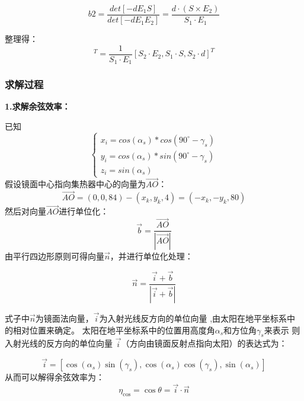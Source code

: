 \documentclass{数学建模}
\begin{document}
\begin{equation}
    b2 = \frac{det[-d E_1 S ]}{det[-d E_1 E_2]} = \frac{d \cdot (S\times E_2)}{S_1\cdot E_1}
\end{equation}

整理得：
\begin{equation}
    [t,b1,b2 ]^T = \frac{1}{S_1\cdot E_1}  [S_2 \cdot E_2,S_1 \cdot S,S_2 \cdot d ]^T
\end{equation}

\subsubsection{求解过程}

\textbf{1.求解余弦效率：}


已知
\begin{equation}
    \begin{cases}
        x_{i} = cos(\alpha_s)*cos(90^\circ - \gamma_s)  \\
        y_{i} = cos(\alpha_s)*sin(90^\circ - \gamma_s)  \\
        z_{i} = sin(\alpha_s)
    \end{cases}
\end{equation}
假设镜面中心指向集热器中心的向量为$\overrightarrow{AO} $：
\begin{equation}
    \vec{AO} =(0,0,84) -(x_k,y_k,4) = (-x_k,-y_k,80)
\end{equation}
然后对向量$\overrightarrow{AO} $进行单位化：
\begin{equation}
    \vec{b} = \frac{\vec{AO}}{|\vec{AO}|}
\end{equation}
由平行四边形原则可得向量$\vec{n}$，并进行单位化处理：

\begin{equation}
    \vec{n} = \frac{\vec{i} + \vec{b}}{|\vec{i} + \vec{b}|}
\end{equation}

式子中$\vec{n}$为镜面法向量，$\vec{i}$为入射光线反方向的单位向量
,由太阳在地平坐标系中的相对位置来确定。
太阳在地平坐标系中的位置用高度角$\alpha_s $和方位角$\gamma_s$来表示
则入射光线的反方向的单位向量
$\vec{i}$（方向由镜面反射点指向太阳）的表达式为：

\begin{equation}
    \vec{i} = [ \cos (\alpha_s) \sin (\gamma_s),  \cos (\alpha_s) \cos (\gamma_s),  \sin (\alpha_s)] 
\end{equation}
从而可以解得余弦效率为：
\begin{equation}
    \eta_{\cos} = \cos \theta = \vec{i} \cdot \vec{n}
\end{equation}
\end{document}
